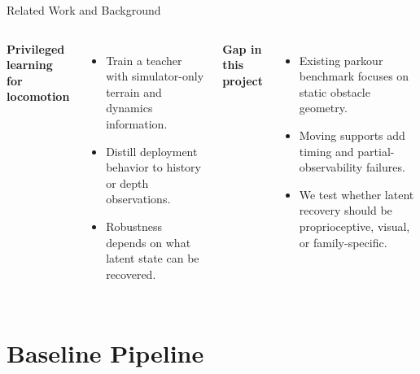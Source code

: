 \documentclass[aspectratio=169,xcolor=dvipsnames]{beamer}
\begin{document}
\begin{frame}{Related Work and Background}
    \begin{columns}[T,onlytextwidth]
        \textbf{Privileged learning for locomotion}
        \begin{itemize}
            \setlength{\itemsep}{0.35em}
            \item Train a teacher with simulator-only terrain and dynamics information.
            \item Distill deployment behavior to history or depth observations.
            \item Robustness depends on what latent state can be recovered.
        \end{itemize}

        \textbf{Gap in this project}
        \begin{itemize}
            \setlength{\itemsep}{0.35em}
            \item Existing parkour benchmark focuses on static obstacle geometry.
            \item Moving supports add timing and partial-observability failures.
            \item We test whether latent recovery should be proprioceptive, visual, or family-specific.
        \end{itemize}
    \end{columns}
\end{frame}

\section{Baseline Pipeline}
\end{document}
